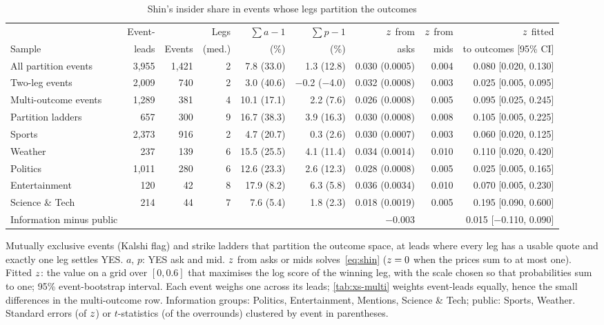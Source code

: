 \begin{table}[!htbp]
\centering
\begin{threeparttable}
\caption{Shin's insider share in events whose legs partition the outcomes}\label{tab:structural-shin}
\scriptsize
\setlength{\tabcolsep}{2.8pt}
\begin{tabular}{@{}lrrrrrrrr@{}}
\toprule
 & Event- & & Legs & $\sum a-1$ & $\sum p-1$ & $z$ from & $z$ from & $z$ fitted \\
Sample & leads & Events & (med.) & (\%) & (\%) & asks & mids & to outcomes [95\% CI] \\
\midrule
All partition events & 3{,}955 & 1{,}421 & 2 & 7.8 (33.0) & 1.3 (12.8) & 0.030 (0.0005) & 0.004 & 0.080 [0.020, 0.130] \\
\quad Two-leg events & 2{,}009 & 740 & 2 & 3.0 (40.6) & $-$0.2 ($-$4.0) & 0.032 (0.0008) & 0.003 & 0.025 [0.005, 0.095] \\
\quad Multi-outcome events & 1{,}289 & 381 & 4 & 10.1 (17.1) & 2.2 (7.6) & 0.026 (0.0008) & 0.005 & 0.095 [0.025, 0.245] \\
\quad Partition ladders & 657 & 300 & 9 & 16.7 (38.3) & 3.9 (16.3) & 0.030 (0.0008) & 0.008 & 0.105 [0.005, 0.225] \\
\quad Sports & 2{,}373 & 916 & 2 & 4.7 (20.7) & 0.3 (2.6) & 0.030 (0.0007) & 0.003 & 0.060 [0.020, 0.125] \\
\quad Weather & 237 & 139 & 6 & 15.5 (25.5) & 4.1 (11.4) & 0.034 (0.0014) & 0.010 & 0.110 [0.020, 0.420] \\
\quad Politics & 1{,}011 & 280 & 6 & 12.6 (23.3) & 2.6 (12.3) & 0.028 (0.0008) & 0.005 & 0.025 [0.005, 0.165] \\
\quad Entertainment & 120 & 42 & 8 & 17.9 (8.2) & 6.3 (5.8) & 0.036 (0.0034) & 0.010 & 0.070 [0.005, 0.230] \\
\quad Science \& Tech & 214 & 44 & 7 & 7.6 (5.4) & 1.8 (2.3) & 0.018 (0.0019) & 0.005 & 0.195 [0.090, 0.600] \\
\quad Information minus public & & & & & & $-$0.003 & & 0.015 [$-$0.110, 0.090] \\
\bottomrule
\end{tabular}
\begin{tablenotes}\footnotesize
\item Mutually exclusive events (Kalshi flag) and strike ladders that partition the outcome space, at leads where every leg has a usable quote and exactly one leg settles YES. $a$, $p$: YES ask and mid. $z$ from asks or mids solves~\eqref{eq:shin} ($z=0$ when the prices sum to at most one). Fitted $z$: the value on a grid over $[0,0.6]$ that maximises the log score of the winning leg, with the scale chosen so that probabilities sum to one; 95\% event-bootstrap interval. Each event weighs one across its leads; \cref{tab:xs-multi} weights event-leads equally, hence the small differences in the multi-outcome row. Information groups: Politics, Entertainment, Mentions, Science \& Tech; public: Sports, Weather. Standard errors (of $z$) or $t$-statistics (of the overrounds) clustered by event in parentheses.

\end{tablenotes}
\end{threeparttable}
\end{table}
